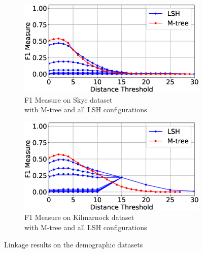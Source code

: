 \documentclass{llncs}
\begin{document}
\begin{figure}
\begin{subfigure}{.5\textwidth}
  \centering
\includegraphics[width=\textwidth]{figures/plotFs-skye-f}
\vspace{-6mm}
\caption{F1 Measure on Skye dataset \\ with M-tree and all LSH configurations}
\end{subfigure}%
\begin{subfigure}{.5\textwidth}
  \centering
\includegraphics[width=\textwidth]{figures/plotFs-kilmarnock-f}
\vspace{-6mm}
\caption{F1 Measure on Kilmarnock dataset \\ with M-tree and all LSH configurations}
\end{subfigure}

\caption{Linkage results on the demographic datasets}
\label{demography-quality}
\end{figure}

\end{document}
